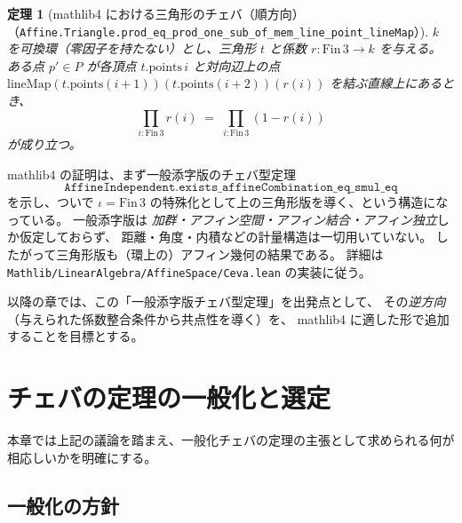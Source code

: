 \documentclass[a4paper,12pt]{bxjsbook}
\makeatletter
\newlength{\customindent}
\newenvironment{body}{
  \par
  \begingroup
  \setlength{\leftskip}{\customindent}
  \setlength{\rightskip}{0pt}
  \setlength{\parindent}{1em}
  \setlength{\displayindent}{\customindent}
  \setlength{\displaywidth}{\dimexpr\linewidth-\customindent\relax}
}{
  \par
  \endgroup
}
\theoremstyle{theorem}
\newtheorem{theorem}{定理}[chapter]
\renewenvironment{proof}[1][\proofname]{%
  \par\pushQED{\qed}%
  \normalfont
  \topsep6\p@\@plus6\p@\relax
  \list{}{%
    \leftmargin=\customindent
    \rightmargin=0pt
    \labelwidth=0pt
    \labelsep=0pt
    \itemindent=0pt
    \listparindent=0pt
    \parsep=0pt
  }%
  \item[\itshape #1\@addpunct{.}\hspace{0.5em}]%
  \setlength{\displayindent}{\customindent}%
  \setlength{\displaywidth}{\dimexpr\linewidth-\customindent\relax}%
  \ignorespaces
}{%
  \popQED\endlist\@endpefalse
}
\makeatother
\begin{document}
    \begin{theorem}[mathlib4 における三角形のチェバ（順方向）{\small（\texttt{Affine.Triangle.prod\_eq\_prod\_one\_sub\_of\_mem\_line\_point\_lineMap}）}]
        $k$ を可換環（零因子を持たない）とし、三角形 $t$ と係数 $r:\mathrm{Fin}\,3\to k$ を与える。
        ある点 $p'\in P$ が各頂点 $t.\mathrm{points}\,i$ と対向辺上の点
        $\mathrm{lineMap}(t.\mathrm{points}(i+1))(t.\mathrm{points}(i+2))(r(i))$
        を結ぶ直線上にあるとき、
        \[
          \prod_{i:\mathrm{Fin}\,3} r(i)\;=\;\prod_{i:\mathrm{Fin}\,3}(1-r(i))
        \]
        が成り立つ。
    \end{theorem}

    \begin{proof}[証明の概略（なぜ「アフィン幾何の結果」なのか）]
        mathlib4 の証明は、まず一般添字版のチェバ型定理
        \[
          \texttt{AffineIndependent.exists\_affineCombination\_eq\_smul\_eq}
        \]
        を示し、ついで $ι=\mathrm{Fin}\,3$ の特殊化として上の三角形版を導く、という構造になっている。
        一般添字版は \emph{加群・アフィン空間・アフィン結合・アフィン独立}しか仮定しておらず、
        距離・角度・内積などの計量構造は一切用いていない。
        したがって三角形版も（環上の）アフィン幾何の結果である。
        詳細は \texttt{Mathlib/LinearAlgebra/AffineSpace/Ceva.lean} の実装に従う。
    \end{proof}

    \begin{body}
        \indent 以降の章では、この「一般添字版チェバ型定理」を出発点として、
        その\emph{逆方向}（与えられた係数整合条件から共点性を導く）を、
        mathlib4 に適した形で追加することを目標とする。
    \end{body}


    \chapter{チェバの定理の一般化と選定}
    \begin{body}
        \indent 本章では上記の議論を踏まえ、一般化チェバの定理の主張として求められる何が相応しいかを明確にする。
    \end{body}

    \section{一般化の方針}
\end{document}
